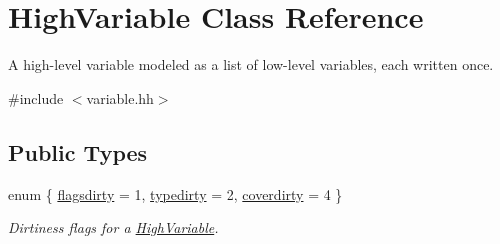 \hypertarget{class_high_variable}{}\section{High\+Variable Class Reference}
\label{class_high_variable}


A high-\/level variable modeled as a list of low-\/level variables, each written once.  




{\ttfamily \#include $<$variable.\+hh$>$}

\subsection*{Public Types}
\begin{DoxyCompactItemize}
\item 
enum \{ \mbox{\hyperlink{class_high_variable_aedc1558735706370d950fecdb08e348ca4fae0776c677992bb2eccdd774ffde37}{flagsdirty}} = 1, 
\mbox{\hyperlink{class_high_variable_aedc1558735706370d950fecdb08e348cabb98b82a95ae5d582a52f5470e2a0a86}{typedirty}} = 2, 
\mbox{\hyperlink{class_high_variable_aedc1558735706370d950fecdb08e348ca0fcd0f7d35521e76a5ae0b950e965891}{coverdirty}} = 4
 \}
\begin{DoxyCompactList}\small\item\em Dirtiness flags for a \mbox{\hyperlink{class_high_variable}{High\+Variable}}. \end{DoxyCompactList}\end{DoxyCompactItemize}
